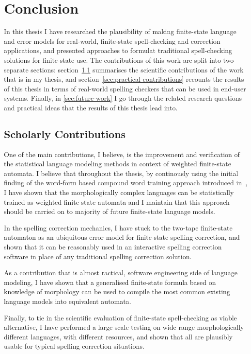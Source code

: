 \documentclass[officiallayout]{unihelcompling}
\begin{document}
\chapter{Conclusion}
\label{chap:conclusion}

In this thesis I have researched the plausibility of making finite-state
language and error models for real-world, finite-state spell-checking and
correction applications, and presented approaches to formulat traditional
spell-checking solutions for finite-state use. The contributions of this work
are split into two separate sections: section~\ref{sec:scholarly-contributions}
summarises the scientific contributions of the work that is in my thesis, and
section~\ref{sec:practical-contributions} recounts the results of this thesis
in terms of real-world spelling checkers that can be used in end-user systems.
Finally, in \ref{sec:future-work} I go through the related research questions
and practical ideas that the results of this thesis lead into.

\section{Scholarly Contributions}
\label{sec:scholarly-contributions}

One of the main contributions, I believe, is the improvement and verification
of the statistical language modeling methods in context of weighted 
finite-state automata. I believe that throughout the thesis, by continously
using the initial finding of the word-form based compound word training
approach introduced in~, I have shown that the
morphologically complex languages can be statistically trained as weighted
finite-state automata and I maintain that this approach should be carried on
to majority of future finite-state language models.

In the spelling correction mechanics, I have stuck to the two-tape finite-state
automaton as an ubiquitous error model for finite-state spelling correction,
and shown that it can be reasonably used in an interactive spelling correction
software in place of any traditional spelling correction solution.

As a contribution that is almost ractical, software engineering side of
language modeling, I have shown that a generalised finite-state formula based
on knowledge of morphology can be used to compile the most common existing
language models into equivalent automata.

Finally, to tie in the scientific evaluation of finite-state spell-checking as
viable alternative, I have performed a large scale testing on wide range
morphologically different languages, with different resources, and shown that
all are plausibly usable for typical spelling correction situations.
\end{document}

